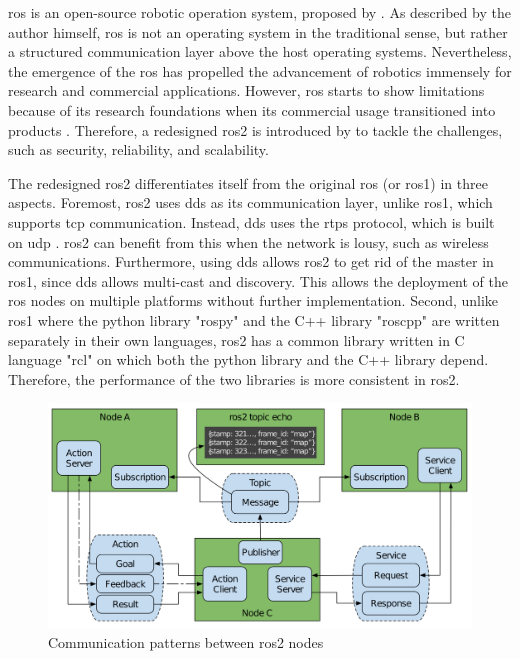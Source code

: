 \gls{ros} is an open-source robotic operation system, proposed by \citeauthor*{Quigley2009} \cite{Quigley2009}. As described by the author himself, \gls{ros} is not an operating system in the traditional sense, but rather a structured communication layer above the host operating systems. Nevertheless, the emergence of the \gls{ros} has propelled the advancement of robotics immensely for research and commercial applications. However, \gls{ros} starts to show limitations because of its research foundations when its commercial usage transitioned into products \cite{Macenski2022}. Therefore, a redesigned \gls{ros}2 is introduced by \citeauthor*{Macenski2022} \cite{Macenski2022} to tackle the challenges, such as security, reliability, and scalability.

The redesigned \gls{ros}2 differentiates itself from the original \gls{ros} (or \gls{ros}1) in three aspects. Foremost, \gls{ros}2 uses \gls{dds} as its communication layer, unlike \gls{ros}1, which supports \gls{tcp} communication. Instead, \gls{dds} uses the \gls{rtps} protocol, which is built on \gls{udp} \cite{OMG2021}. \gls{ros}2 can benefit from this when the network is lousy, such as wireless communications. Furthermore, using \gls{dds} allows \gls{ros}2 to get rid of the master in \gls{ros}1, since \gls{dds} allows multi-cast and discovery. This allows the deployment of the \gls{ros} nodes on multiple platforms without further implementation. Second, unlike \gls{ros}1 where the \gls{python} library "rospy" and the C++ library "roscpp" are written separately in their own languages, \gls{ros}2 has a common library written in C language "rcl" on which both the \gls{python} library and the C++ library depend. Therefore, the performance of the two libraries is more consistent in \gls{ros}2.

\begin{figure}
    \centering
    \includegraphics[width=\linewidth]{figures/background/ros2_node_interfaces.png}
    \caption[Communication patterns between \acrshort{ros}2 nodes]{Communication patterns between \acrshort{ros}2 nodes \cite{Macenski2022}}
    \label{fig:communication_patterns} 
\end{figure}

